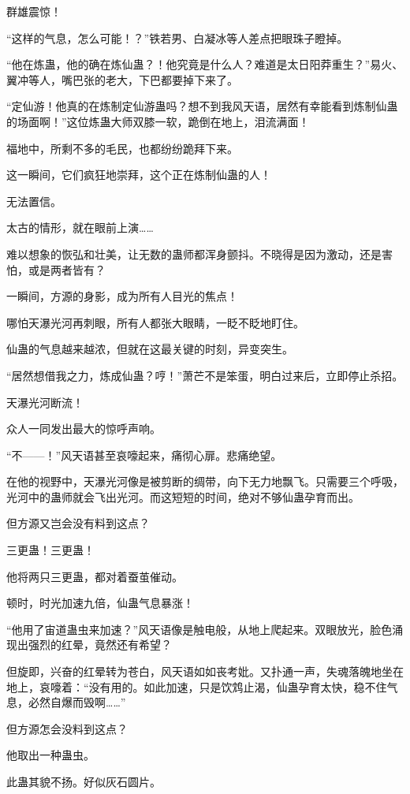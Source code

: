 \begin{this_body}
群雄震惊！

“这样的气息，怎么可能！？”铁若男、白凝冰等人差点把眼珠子瞪掉。

“他在炼蛊，他的确在炼仙蛊？！他究竟是什么人？难道是太日阳莽重生？”易火、翼冲等人，嘴巴张的老大，下巴都要掉下来了。

“定仙游！他真的在炼制定仙游蛊吗？想不到我风天语，居然有幸能看到炼制仙蛊的场面啊！”这位炼蛊大师双膝一软，跪倒在地上，泪流满面！

福地中，所剩不多的毛民，也都纷纷跪拜下来。

这一瞬间，它们疯狂地崇拜，这个正在炼制仙蛊的人！

无法置信。

太古的情形，就在眼前上演……

难以想象的恢弘和壮美，让无数的蛊师都浑身颤抖。不晓得是因为激动，还是害怕，或是两者皆有？

一瞬间，方源的身影，成为所有人目光的焦点！

哪怕天瀑光河再刺眼，所有人都张大眼睛，一眨不眨地盯住。

仙蛊的气息越来越浓，但就在这最关键的时刻，异变突生。

“居然想借我之力，炼成仙蛊？哼！”萧芒不是笨蛋，明白过来后，立即停止杀招。

天瀑光河断流！

众人一同发出最大的惊呼声响。

“不——！”风天语甚至哀嚎起来，痛彻心扉。悲痛绝望。

在他的视野中，天瀑光河像是被剪断的绸带，向下无力地飘飞。只需要三个呼吸，光河中的蛊师就会飞出光河。而这短短的时间，绝对不够仙蛊孕育而出。

但方源又岂会没有料到这点？

三更蛊！三更蛊！

他将两只三更蛊，都对着蚕茧催动。

顿时，时光加速九倍，仙蛊气息暴涨！

“他用了宙道蛊虫来加速？”风天语像是触电般，从地上爬起来。双眼放光，脸色涌现出强烈的红晕，竟然还有希望？

但旋即，兴奋的红晕转为苍白，风天语如如丧考妣。又扑通一声，失魂落魄地坐在地上，哀嚎着：“没有用的。如此加速，只是饮鸩止渴，仙蛊孕育太快，稳不住气息，必然自爆而毁啊……”

但方源怎会没料到这点？

他取出一种蛊虫。

此蛊其貌不扬。好似灰石圆片。


\end{this_body}

